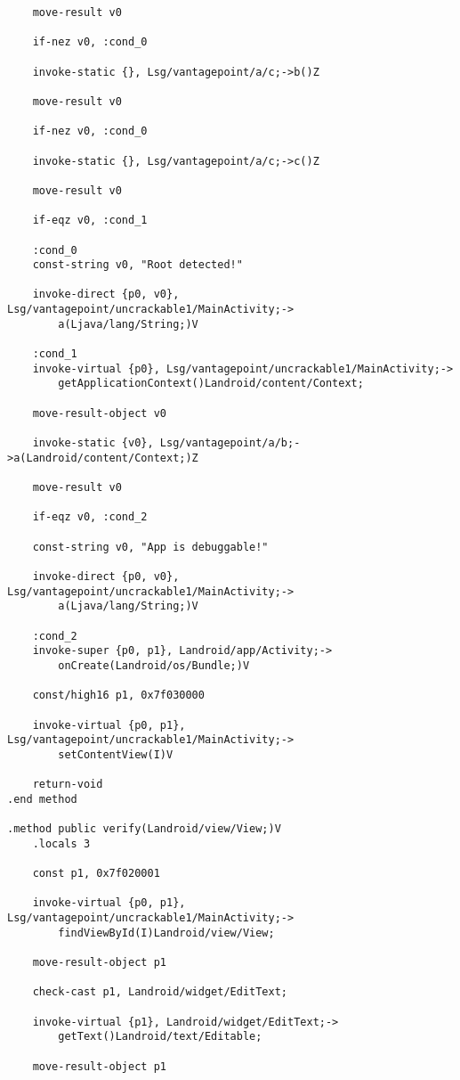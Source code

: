 \begin{verbatim}
    move-result v0

    if-nez v0, :cond_0

    invoke-static {}, Lsg/vantagepoint/a/c;->b()Z

    move-result v0

    if-nez v0, :cond_0

    invoke-static {}, Lsg/vantagepoint/a/c;->c()Z

    move-result v0

    if-eqz v0, :cond_1

    :cond_0
    const-string v0, "Root detected!"

    invoke-direct {p0, v0}, Lsg/vantagepoint/uncrackable1/MainActivity;->
        a(Ljava/lang/String;)V

    :cond_1
    invoke-virtual {p0}, Lsg/vantagepoint/uncrackable1/MainActivity;->
        getApplicationContext()Landroid/content/Context;

    move-result-object v0

    invoke-static {v0}, Lsg/vantagepoint/a/b;->a(Landroid/content/Context;)Z

    move-result v0

    if-eqz v0, :cond_2

    const-string v0, "App is debuggable!"

    invoke-direct {p0, v0}, Lsg/vantagepoint/uncrackable1/MainActivity;->
        a(Ljava/lang/String;)V

    :cond_2
    invoke-super {p0, p1}, Landroid/app/Activity;->
        onCreate(Landroid/os/Bundle;)V

    const/high16 p1, 0x7f030000

    invoke-virtual {p0, p1}, Lsg/vantagepoint/uncrackable1/MainActivity;->
        setContentView(I)V

    return-void
.end method

.method public verify(Landroid/view/View;)V
    .locals 3

    const p1, 0x7f020001

    invoke-virtual {p0, p1}, Lsg/vantagepoint/uncrackable1/MainActivity;->
        findViewById(I)Landroid/view/View;

    move-result-object p1

    check-cast p1, Landroid/widget/EditText;

    invoke-virtual {p1}, Landroid/widget/EditText;->
        getText()Landroid/text/Editable;

    move-result-object p1


\end{verbatim}

